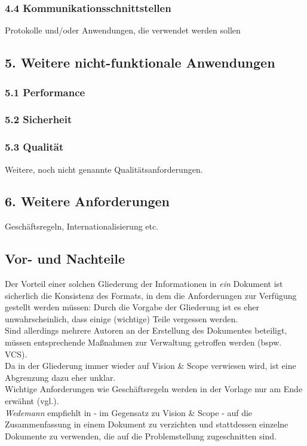 \subsubsection*{4.4 Kommunikationsschnittstellen}
Protokolle und/oder Anwendungen, die verwendet werden sollen

\subsection*{5. Weitere nicht-funktionale Anwendungen}

\subsubsection*{5.1 Performance}
\subsubsection*{5.2 Sicherheit}
\subsubsection*{5.3 Qualität}
Weitere, noch nicht genannte Qualitätsanforderungen.

\subsection*{6. Weitere Anforderungen}
Geschäftsregeln, Internationalisierung etc.


\subsection{Vor- und Nachteile}
Der Vorteil einer solchen Gliederung der Informationen in \textit{ein} Dokument ist sicherlich die Konsistenz des Formats, in dem die Anforderungen zur Verfügung gestellt werden müssen: Durch die Vorgabe der Gliederung ist es eher unwahrscheinlich, dass einige (wichtige) Teile vergessen werden.\\

\noindent
Sind allerdings mehrere Autoren an der Erstellung des Dokumentes beteiligt, müssen entsprechende Maßnahmen zur Verwaltung getroffen werden (bspw. VCS).\\
Da in der Gliederung immer wieder auf Vision \& Scope verwiesen wird, ist eine Abgrenzung dazu eher unklar.\\
Wichtige Anforderungen wie Geschäftsregeln werden in der Vorlage nur am Ende erwähnt (vgl.\cite[79]{Wed09}).\\

\noindent
\textit{Wedemann} empfiehlt in \cite[80]{Wed09} - im Gegensatz zu Vision \& Scope - auf die Zusammenfassung in einem Dokument zu verzichten und stattdessen einzelne Dokumente zu verwenden, die auf die Problemstellung zugeschnitten sind.

